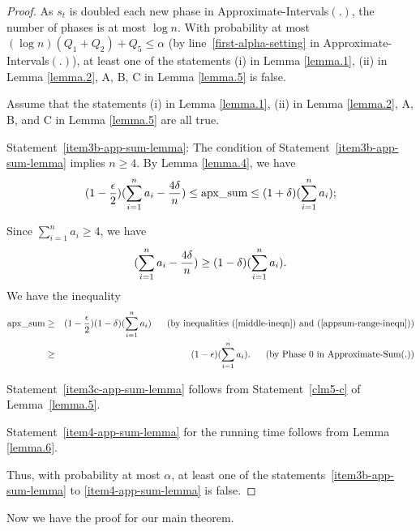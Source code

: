 \documentclass[runningheads]{llncs}
\newcommand{\appsum}{{\rm apx\_sum}}
\begin{document}
\begin{proof}
As $s_t$ is doubled each new phase in Approximate-Intervals$(.)$,
the number of phases is at most $\log n$. With probability at most
$(\log n)(Q_1+Q_2)+Q_5\le \alpha$ (by line~\ref{first-alpha-setting}
in Approximate-Intervals$(.)$), at least one of the statements (i)
in Lemma \ref{lemma.1}, (ii) in Lemma \ref{lemma.2}, A, B, C in
Lemma \ref{lemma.5} is false.




Assume that the statements (i) in Lemma \ref{lemma.1}, (ii) in Lemma
\ref{lemma.2}, A, B, and C in Lemma \ref{lemma.5} are all true.


Statement~\ref{item3b-app-sum-lemma}: The condition of Statement~\ref{item3b-app-sum-lemma} implies $n\ge
4$. By Lemma \ref{lemma.4},  we have
\begin{eqnarray}
(1-{\epsilon\over 2})(\sum_{i=1}^na_i-{4\delta\over n})\le
\appsum\le (1+\delta)(\sum_{i=1}^na_i); \label{appsum-range-ineqn}
\end{eqnarray}

 Since
$\sum_{i=1}^na_i\ge 4$, we have
\begin{eqnarray}
(\sum_{i=1}^na_i-{4\delta\over n})\ge
(1-\delta)(\sum_{i=1}^na_i).\label{middle-ineqn}
\end{eqnarray}
We have the inequality
\begin{eqnarray}
\appsum&\ge& (1-{\epsilon\over
2})(1-\delta)(\sum_{i=1}^na_i)\ \ \ \ \ \mbox{(by\ inequalities\ (\ref{middle-ineqn})\ and\ (\ref{appsum-range-ineqn}))}\\
&\ge& (1-\epsilon)(\sum_{i=1}^na_i). \ \ \ \ \ \mbox{(by Phase 0 in
Approximate-Sum(.))}
\end{eqnarray}

 Statement~\ref{item3c-app-sum-lemma} follows from
Statement~\ref{clm5-c} of Lemma~\ref{lemma.5}.


Statement~\ref{item4-app-sum-lemma} for the running time follows
from Lemma \ref{lemma.6}.

 Thus,
with probability at  most $\alpha$, at least one of the
statements~\ref{item3b-app-sum-lemma} to \ref{item4-app-sum-lemma}
is false.
\end{proof}




Now we have the proof for our main theorem.
\end{document}
